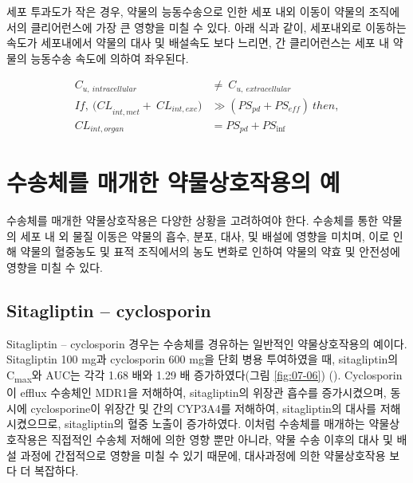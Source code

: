 \documentclass[
  11pt,
  krantz2, a4paper, twoside]{krantz}
\begin{document}
세포 투과도가 작은 경우, 약물의 능동수송으로 인한 세포 내외 이동이
약물의 조직에서의 클리어런스에 가장 큰 영향을 미칠 수 있다. 아래 식과
같이, 세포내외로 이동하는 속도가 세포내에서 약물의 대사 및 배설속도 보다
느리면, 간 클리어런스는 세포 내 약물의 능동수송 속도에 의하여 좌우된다.

\begin{equation}
\begin{split}
C_{u,\ intracellular} &\neq \ C_{u,\ extracellular} \\
{If,\ (CL}_{int,met} + \ {CL}_{int,exc}) &\gg \left( {PS}_{pd} + {PS}_{eff} \right)\ then, \\
{CL}_{int,organ} &= {PS}_{pd} + {PS}_{\inf}
\end{split}
\label{eq:eq07-02} 
\end{equation}

\section{수송체를 매개한 약물상호작용의 예}\label{uxc218uxc1a1uxccb4uxb97c-uxb9e4uxac1cuxd55c-uxc57duxbb3cuxc0c1uxd638uxc791uxc6a9uxc758-uxc608}

수송체를 매개한 약물상호작용은 다양한 상황을 고려하여야 한다. 수송체를
통한 약물의 세포 내 외 물질 이동은 약물의 흡수, 분포, 대사, 및 배설에
영향을 미치며, 이로 인해 약물의 혈중농도 및 표적 조직에서의 농도 변화로
인하여 약물의 약효 및 안전성에 영향을 미칠 수 있다.

\subsection{Sitagliptin -- cyclosporin}\label{sitagliptin-cyclosporin}

Sitagliptin -- cyclosporin 경우는 수송체를 경유하는 일반적인
약물상호작용의 예이다. Sitagliptin 100 mg과 cyclosporin 600 mg을 단회
병용 투여하였을 때, sitagliptin의 C\textsubscript{max}와 AUC는 각각 1.68 배와 1.29 배
증가하였다(그림 \ref{fig:07-06}) (). Cyclosporin이
efflux 수송체인 MDR1을 저해하여, sitagliptin의 위장관 흡수를
증가시켰으며, 동시에 cyclosporine이 위장간 및 간의 CYP3A4를 저해하여,
sitagliptin의 대사를 저해시켰으므로, sitagliptin의 혈중 노출이
증가하였다. 이처럼 수송체를 매개하는 약물상호작용은 직접적인 수송체
저해에 의한 영향 뿐만 아니라, 약물 수송 이후의 대사 및 배설 과정에
간접적으로 영향을 미칠 수 있기 때문에, 대사과정에 의한 약물상호작용 보다
더 복잡하다.
\end{document}
